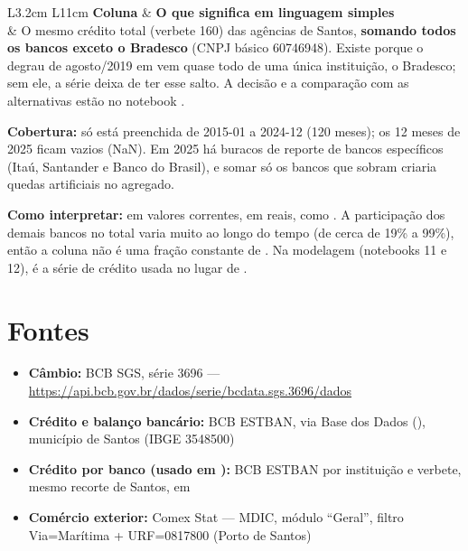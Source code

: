 \documentclass[11pt,a4paper]{article}
\begin{document}
\vspace{0.5em}
\begin{longtable}{L{3.2cm} L{11cm}}
\toprule
\textbf{Coluna} & \textbf{O que significa em linguagem simples} \\
\midrule
\endhead
\texttt{} &
O mesmo crédito total (verbete 160) das agências de Santos, \textbf{somando todos os bancos exceto o Bradesco} (CNPJ básico 60746948). Existe porque o degrau de agosto/2019 em \texttt{} vem quase todo de uma única instituição, o Bradesco; sem ele, a série deixa de ter esse salto. A decisão e a comparação com as alternativas estão no notebook \texttt{}. \\
\bottomrule
\end{longtable}

\noindent\textbf{Cobertura:} só está preenchida de 2015-01 a 2024-12 (120 meses); os 12 meses de 2025 ficam vazios (NaN). Em 2025 há buracos de reporte de bancos específicos (Itaú, Santander e Banco do Brasil), e somar só os bancos que sobram criaria quedas artificiais no agregado.

\vspace{0.4em}
\noindent\textbf{Como interpretar:} em valores correntes, em reais, como \texttt{}. A participação dos demais bancos no total varia muito ao longo do tempo (de cerca de 19\% a 99\%), então a coluna não é uma fração constante de \texttt{}. Na modelagem (notebooks 11 e 12), é a série de crédito usada no lugar de \texttt{}.

\section*{Fontes}
\begin{itemize}[leftmargin=1.2em]
    \item \textbf{Câmbio:} BCB SGS, série 3696 --- \url{https://api.bcb.gov.br/dados/serie/bcdata.sgs.3696/dados}
    \item \textbf{Crédito e balanço bancário:} BCB ESTBAN, via Base dos Dados (\texttt{}), município de Santos (IBGE 3548500)
    \item \textbf{Crédito por banco (usado em \texttt{}):} BCB ESTBAN por instituição e verbete, mesmo recorte de Santos, em \texttt{}
    \item \textbf{Comércio exterior:} Comex Stat --- MDIC, módulo ``Geral'', filtro Via=Marítima + URF=0817800 (Porto de Santos)
\end{itemize}
\end{document}
